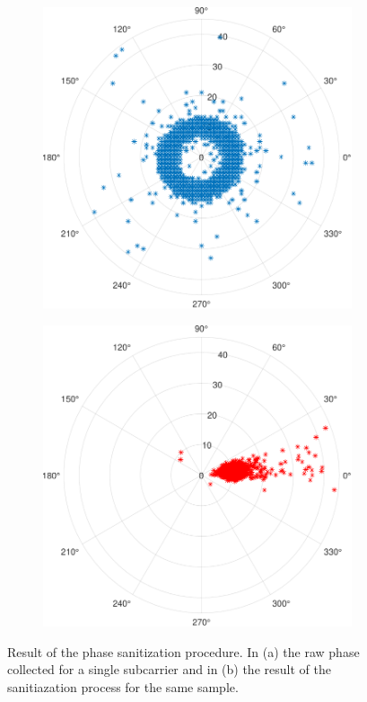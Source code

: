 \documentclass[binding=0.6cm,noexaminfo]{sapthesis}
\begin{document}
\begin{figure}[h!]
\centering
\begin{subfigure}{.49\textwidth}
	\centering
	\includegraphics[width=.9\linewidth]{raw_phase subcarrier_42}
	\caption{}
\end{subfigure}
\begin{subfigure}{.49\textwidth}
	\centering
	\includegraphics[width=.9\linewidth]{sanitized_phase subcarrier_42}
	\caption{}
\end{subfigure}
\caption{Result of the phase sanitization procedure. In (a) the raw phase collected for a single subcarrier and in (b) the result of the sanitiazation process for the same sample.}
\label{fig:pha-san}
\end{figure}
\end{document}
